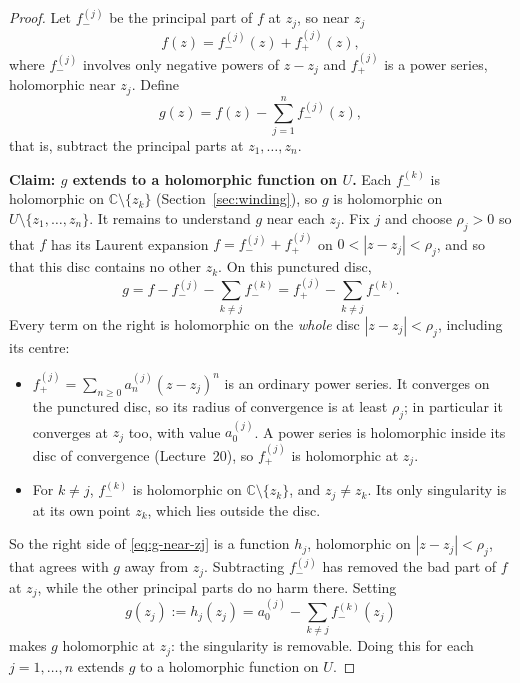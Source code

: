 \documentclass[11pt]{article}
\theoremstyle{plain}
\theoremstyle{definition}
\theoremstyle{remark}
\numberwithin{equation}{section}
\newcommand{\C}{\mathbb{C}}
\begin{document}
\begin{proof}
Let $f_-^{(j)}$ be the principal part of $f$ at $z_j$, so near $z_j$
\begin{equation}
 f(z)=f_-^{(j)}(z)+f_+^{(j)}(z),
\end{equation}
where $f_-^{(j)}$ involves only negative powers of $z-z_j$ and $f_+^{(j)}$
is a power series, holomorphic near $z_j$. Define
\begin{equation}
 g(z)=f(z)-\sum_{j=1}^{n}f_-^{(j)}(z),
\end{equation}
that is, subtract the principal parts at $z_1,\dots,z_n$.

\textbf{Claim: $g$ extends to a holomorphic function on $U$.} Each
$f_-^{(k)}$ is holomorphic on $\C\setminus\{z_k\}$ (Section~\ref{sec:winding}),
so $g$ is holomorphic on $U\setminus\{z_1,\dots,z_n\}$. It remains to
understand $g$ near each $z_j$. Fix $j$ and choose $\rho_j>0$ so that $f$ has
its Laurent expansion $f=f_-^{(j)}+f_+^{(j)}$ on $0<|z-z_j|<\rho_j$, and so
that this disc contains no other $z_k$. On this punctured disc,
\begin{equation}\label{eq:g-near-zj}
 g=f-f_-^{(j)}-\sum_{k\ne j}f_-^{(k)}
  =f_+^{(j)}-\sum_{k\ne j}f_-^{(k)}.
\end{equation}
Every term on the right is holomorphic on the \emph{whole} disc
$|z-z_j|<\rho_j$, including its centre:
\begin{itemize}
 \item $f_+^{(j)}=\sum_{n\geq0}a_n^{(j)}(z-z_j)^n$ is an ordinary power
 series. It converges on the punctured disc, so its radius of convergence
 is at least $\rho_j$; in particular it converges at $z_j$ too, with value
 $a_0^{(j)}$. A power series is holomorphic inside its disc of convergence
 (Lecture~20), so $f_+^{(j)}$ is holomorphic at $z_j$.
 \item For $k\ne j$, $f_-^{(k)}$ is holomorphic on $\C\setminus\{z_k\}$, and
 $z_j\ne z_k$. Its only singularity is at its own point $z_k$, which lies
 outside the disc.
\end{itemize}
So the right side of \eqref{eq:g-near-zj} is a function $h_j$, holomorphic
on $|z-z_j|<\rho_j$, that agrees with $g$ away from $z_j$. Subtracting
$f_-^{(j)}$ has removed the bad part of $f$ at $z_j$, while the other
principal parts do no harm there. Setting
\begin{equation}
 g(z_j):=h_j(z_j)=a_0^{(j)}-\sum_{k\ne j}f_-^{(k)}(z_j)
\end{equation}
makes $g$ holomorphic at $z_j$: the singularity is removable. Doing this
for each $j=1,\dots,n$ extends $g$ to a holomorphic function on $U$.


\end{proof}
\end{document}
